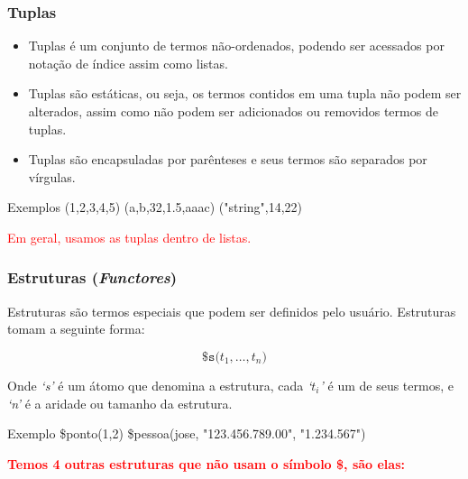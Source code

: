 
\begin{frame}
	\frametitle{Tuplas}
	\begin{itemize}
	  \item 	Tuplas é um conjunto de termos não-ordenados, podendo ser acessados por notação de índice assim como	listas.
	  
	  \item  Tuplas são estáticas, ou seja, os termos contidos em uma tupla não podem ser alterados, assim como	não podem ser adicionados ou removidos termos de tuplas.
	  
	\item   Tuplas são encapsuladas por parênteses e seus termos são separados por vírgulas.

	\end{itemize}
	
	\begin{block}{Exemplos}
		(1,2,3,4,5) \: (a,b,32,1.5,aaac) \: ("string",14,22)
	\end{block}
	
	\textcolor{red}{Em geral, usamos as tuplas dentro de listas.}
\end{frame}


\begin{frame}
	\frametitle{Estruturas (\textit{Functores})}
	
	Estruturas são termos especiais que podem ser definidos pelo usuário. Estruturas tomam a seguinte 
	forma: 
	
	\begin{displaymath}
	\texttt{{\$}s($t_1,\ldots,t_n$)}
	\end{displaymath}
	
	Onde \textit{`s'} é um átomo que denomina a estrutura, cada 
	\textit{`$t_i$'} é um de seus termos, e \textit{`n'} é a aridade ou tamanho da estrutura.
	
	\begin{block}{Exemplo}
		\$ponto(1,2) \: \$pessoa(jose, "123.456.789.00", "1.234.567")
	\end{block}
	
	\pause
	\textbf{\textcolor{red}{Temos 4 outras estruturas  que não usam o símbolo \$, são elas:}}
	
\end{frame}


